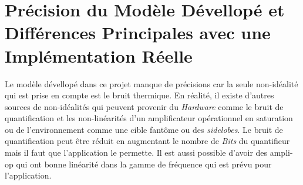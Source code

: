 \section{Précision du Modèle Dévellopé et Différences Principales avec une Implémentation Réelle}

Le modèle dévellopé dans ce projet manque de précisions car la seule non-idéalité qui est prise en compte est le bruit thermique. En réalité, il existe d'autres sources de non-idéalités qui peuvent provenir du \textit{Hardware} comme le bruit de quantification et les non-linéarités d'un amplificateur opérationnel en saturation ou de l'environnement comme une cible fantôme ou des \textit{sidelobes}. Le bruit de quantification peut être réduit en augmentant le nombre de \textit{Bits} du quantifieur mais il faut que l'application le permette. Il est aussi possible d'avoir des ampli-op qui ont bonne linéarité dans la gamme de fréquence qui est prévu pour l'application. 